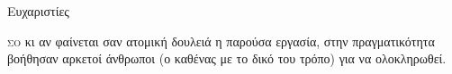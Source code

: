 \begin{center}
{\LARGE Ευχαριστίες}\\[1cm]
\end{center}

\lettrine[findent=2pt]{}{σο} κι αν φαίνεται σαν ατομική δουλειά η παρούσα εργασία, στην πραγματικότητα βοήθησαν αρκετοί άνθρωποι (ο καθένας με το δικό του τρόπο) για να ολοκληρωθεί.
